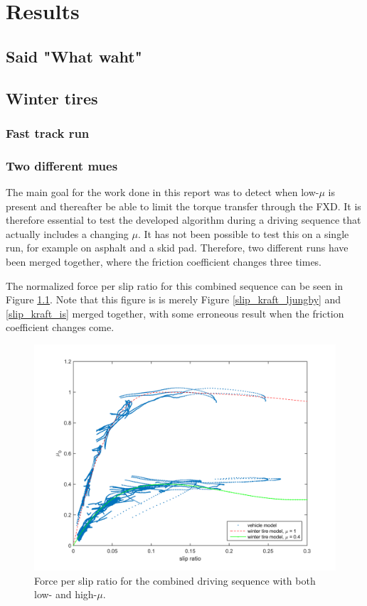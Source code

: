 \chapter{Results}

\section{Said "What waht"}

\section{Winter tires}

\subsection{Fast track run}



\subsection{Two different mues}
The main goal for the work done in this report was to detect when low-$ \mu $ is present and thereafter be able to limit the torque transfer through the FXD. It is therefore essential to test the developed algorithm during a driving sequence that actually includes a changing $ \mu $. It has not been possible to test this on a single run, for example on asphalt and a skid pad. Therefore, two different runs have been merged together, where the friction coefficient changes three times.

The normalized force per slip ratio for this combined sequence can be seen in Figure \ref{slip_kraft_comb2}. Note that this figure is is merely Figure \ref{slip_kraft_ljungby} and \ref{slip_kraft_is} merged together, with some erroneous result when the friction coefficient changes come. 

\begin{figure}[h]
	\centering
	\includegraphics[width=1.0\textwidth]{Pictures/slip_kraft_comb2}
	\caption {Force per slip ratio for the combined driving sequence with both low- and high-$ \mu $.}
	\label{slip_kraft_comb2}
\end{figure}